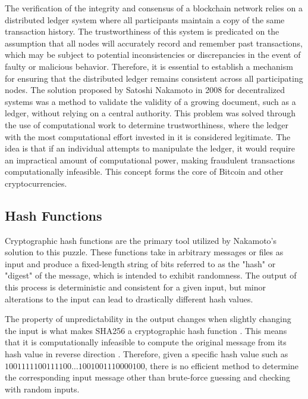 %

The verification of the integrity and consensus of a blockchain network relies on a distributed ledger system where all participants maintain a copy of the same transaction history. The trustworthiness of this system is predicated on the assumption that all nodes will accurately record and remember past transactions, which may be subject to potential inconsistencies or discrepancies in the event of faulty or malicious behavior. Therefore, it is essential to establish a mechanism for ensuring that the distributed ledger remains consistent across all participating nodes. The solution proposed by Satoshi Nakamoto in 2008 for decentralized systems was a method to validate the validity of a growing document, such as a ledger, without relying on a central authority. This problem was solved through the use of computational work to determine trustworthiness, where the ledger with the most computational effort invested in it is considered legitimate. The idea is that if an individual attempts to manipulate the ledger, it would require an impractical amount of computational power, making fraudulent transactions computationally infeasible. This concept forms the core of Bitcoin and other cryptocurrencies.

\subsection{Hash Functions}
Cryptographic hash functions are the primary tool utilized by Nakamoto's solution to this puzzle. These functions take in arbitrary messages or files as input and produce a fixed-length string of bits referred to as the "hash" or "digest" of the message, which is intended to exhibit randomness. The output of this process is deterministic and consistent for a given input, but minor alterations to the input can lead to drastically different hash values.

The property of unpredictability in the output changes when slightly changing the input is what makes SHA256 a cryptographic hash function \cite{dang2015secure}. This means that it is computationally infeasible to compute the original message from its hash value in reverse direction \cite{butin2017hash}. Therefore, given a specific hash value such as $1001111100111100\ldots1001001110000100$, there is no efficient method to determine the corresponding input message other than brute-force guessing and checking with random inputs.


